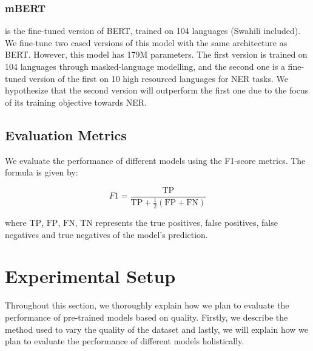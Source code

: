 \documentclass{article}
\begin{document}
\subsubsection*{mBERT} is the fine-tuned version of BERT, trained on 104 languages \cite{DBLP:journals/corr/abs-1911-03310} (Swahili included). We fine-tune two cased versions of this model with the same architecture as BERT. However, this model has 179M parameters. The first version is trained on 104 languages through masked-language modelling, and the second one is a fine-tuned version of the first on 10 high resourced languages for NER tasks. We hypothesize that the second version will outperform the first one due to the focus of its training objective towards NER.


\subsection{Evaluation Metrics}
We evaluate the performance of different models using the F1-score metrics. The formula is given by:

$$F1 = \frac{\mathrm{TP}}{\mathrm{TP}+\frac{1}{2}(\mathrm{FP}+\mathrm{FN})}$$

where $\mathrm{TP}$, $\mathrm{FP}$, $\mathrm{FN}$, $\mathrm{TN}$ represents the true positives, false positives, false negatives and true negatives of the model's prediction.

\section{Experimental Setup}
\label{sec:exp}
Throughout this section, we thoroughly explain how we plan to evaluate the performance of pre-trained models based on quality. Firstly, we describe the method used to vary the quality of the dataset and lastly, we will explain how we plan to evaluate the performance of different models holistically.
\end{document}
